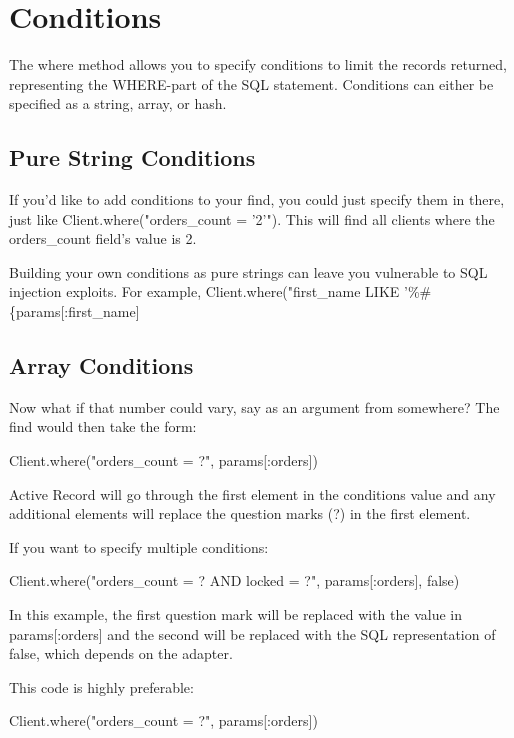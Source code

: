 \documentclass[10pt]{book}
\newenvironment{code}{%
  \scriptsize
    \verbatim
}{%
    \endverbatim
    \newline
}
\begin{document}
\section{ Conditions}

The where method allows you to specify conditions to limit the records returned, representing the WHERE-part of the SQL statement. Conditions can either be specified as a string, array, or hash.

\subsection{ Pure String Conditions}

If you’d like to add conditions to your find, you could just specify them in there, just like Client.where("orders\_count = '2'"). This will find all clients where the orders\_count field’s value is 2.

Building your own conditions as pure strings can leave you vulnerable to SQL injection exploits. For example, Client.where("first\_name LIKE '\%\#\{params[:first\_name]\\%

\subsection{ Array Conditions}

Now what if that number could vary, say as an argument from somewhere? The find would then take the form:
\begin{code}
Client.where("orders_count = ?", params[:orders])
\end{code}

Active Record will go through the first element in the conditions  value and any additional elements will replace the question marks (?) in the first element.

If you want to specify multiple conditions:
\begin{code}
Client.where("orders_count = ? AND locked = ?", 
params[:orders], false)
\end{code}

In this example, the first question mark will be replaced with the value in params[:orders] and the second will be replaced with the SQL representation of false, which depends on the adapter.

This code is highly preferable:
\begin{code}
Client.where("orders_count = ?", params[:orders])
\end{code}
\end{document}
